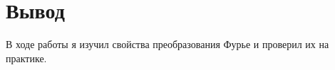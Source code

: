 \chapter{Вывод}
\label{ch:сhap5}

В ходе работы я изучил свойства преобразования Фурье и проверил их на практике.


\endinput